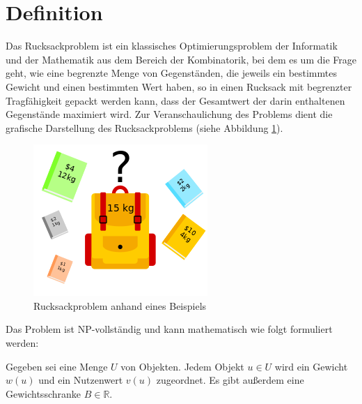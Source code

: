 \documentclass[12pt]{report}
\begin{document}
\section{Definition}



Das Rucksackproblem ist ein klassisches Optimierungsproblem der Informatik und der Mathematik aus dem Bereich der Kombinatorik, bei dem es um die Frage geht, wie eine begrenzte Menge von Gegenständen, die jeweils ein bestimmtes Gewicht und einen bestimmten Wert haben, so in einen Rucksack mit begrenzter Tragfähigkeit gepackt werden kann, dass der Gesamtwert der darin enthaltenen Gegenstände maximiert wird. Zur Veranschaulichung des Problems dient die grafische Darstellung des Rucksackproblems (siehe Abbildung \ref{fig:rucksackproblem}). 

\begin{figure}[h]
	\centering
	\includegraphics[width=0.5 \linewidth]{Knapsack_Problem_Illustration}
	\caption{Rucksackproblem anhand eines Beispiels}
	\label{fig:rucksackproblem}
\end{figure}

Das Problem ist NP-vollständig und kann mathematisch wie folgt formuliert werden:

Gegeben sei eine Menge $U$ von Objekten. Jedem Objekt $u \in U$ wird ein Gewicht $w(u)$ und ein Nutzenwert $v(u)$ zugeordnet. Es gibt außerdem eine Gewichtsschranke $B \in \mathbb{R}$.
\end{document}
